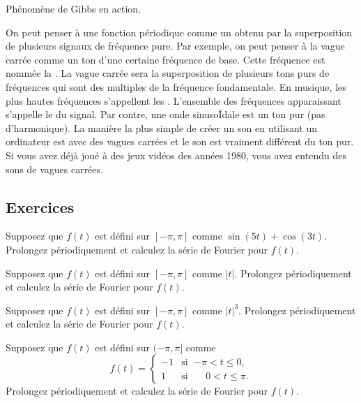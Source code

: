 \begin{myfig}
\capstart
{}
\caption{Phénomène de Gibbs en action.\label{ts:squarewavegibbsfig}}
\end{myfig}

On peut penser à une fonction périodique comme un  obtenu par la superposition de plusieurs signaux de fréquence pure. Par exemple, on peut penser à la vague carrée comme un ton d'une certaine fréquence de base. Cette fréquence est nommée la 
\emph{}.
La vague carrée sera la superposition de plusieurs tons purs de fréquences qui sont des multiples de la fréquence fondamentale. En musique, les plus hautes fréquences s'appellent les \emph{}.
L'ensemble des fréquences apparaissant s'appelle le 
\emph{} du signal. Par contre, une onde sinusoÏdale est un ton pur (pas d'harmonique). La manière la plus simple de créer un son en utilisant un ordinateur est avec des vagues carrées et le son est vraiment différent du ton pur. Si vous avez déjà joué à des jeux vidéos des années 1980, vous avez entendu des sons de vagues carrées. 


\subsection{Exercices}

\begin{exercise}
Supposez que $f(t)$ est défini sur $[-\pi,\pi]$ comme $\sin (5t) + \cos (3t)$.  Prolongez périodiquement et calculez la série de Fourier pour $f(t)$.
\end{exercise}

\begin{exercise}
Supposez que $f(t)$ est défini sur $[-\pi,\pi]$ comme $\lvert t \rvert$.
  Prolongez périodiquement et calculez la série de Fourier pour $f(t)$.
\end{exercise}

\begin{exercise}
Supposez que $f(t)$ est défini sur $[-\pi,\pi]$ comme $\lvert t \rvert^3$.
Prolongez périodiquement et calculez la série de Fourier pour $f(t)$.
\end{exercise}

\begin{exercise}
Supposez que $f(t)$ est défini sur $(-\pi,\pi]$ comme
\begin{equation*}
f(t) =
\begin{cases}
-1 & \text{si } \; {-\pi} < t \leq 0 , \\
1 & \text{si } \; \phantom{-}0 < t \leq \pi .
\end{cases}
\end{equation*}
Prolongez périodiquement et calculez la série de Fourier pour $f(t)$.
\end{exercise}

